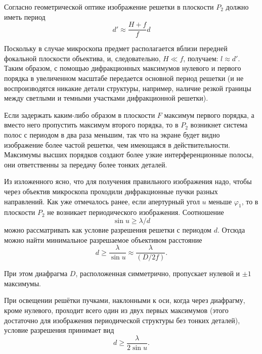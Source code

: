 \documentclass[14pt]{article}
\begin{document}
Согласно геометрической оптике изображение решетки в плоскости
$P_2$ должно иметь период
\begin{equation}
	d' \approx \frac{H + f}{f}d
\end{equation}

Поскольку в случае микроскопа предмет располагается вблизи передней
фокальной плоскости объектива, и, следовательно, $H \ll f$, получаем:
$l \approx d'$. Таким образом, с помощью дифракционных максимумов нулевого
и первого порядка в увеличенном масштабе передается основной период решетки
(и не воспроизводятся никакие детали структуры, например, наличие резкой границы между светлыми
и темными участками дифракционной решетки).

Если задержать каким-либо образом в плоскости $F$ максимум первого
порядка, а вместо него пропустить максимум второго порядка, то
в $P_2$ возникнет система полос с периодом в два раза меньшим, так что
на экране будет видно изображение более частой решетки, чем имеющаяся в действительности. 
Максимумы высших порядков создают более узкие интерференционные полосы, они ответственны за передачу более
тонких деталей.

Из изложенного ясно, что для получения правильного изображения
надо, чтобы через объектив микроскопа проходили дифракционные пучки
разных направлений. Как уже отмечалось ранее, если апертурный угол
$u$ меньше $\varphi_1$, то в плоскости $P_2$ не возникает периодического изображения.
Соотношение
\begin{equation}
	\sin u \geq \lambda/d
\end{equation}
\noindent можно рассматривать как условие разрешения решетки с периодом
$d$. Отсюда можно найти минимальное разрешаемое объективом расстояние
\begin{equation}
	d \geq \frac{\lambda}{\sin u} \approx \frac{\lambda}{(D/2f)}.
\end{equation}

При этом диафрагма $D$, расположенная симметрично, пропускает нулевой и
$\pm 1$ максимумы.

При освещении решётки пучками, наклонными к оси,
когда через диафрагму, кроме нулевого, проходит всего один из двух первых максимумов
(этого достаточно для изображения периодической структуры без тонких деталей),
условие разрешения принимает вид
$$
	d \geq \frac{\lambda}{2\sin u}.
$$
\end{document}
